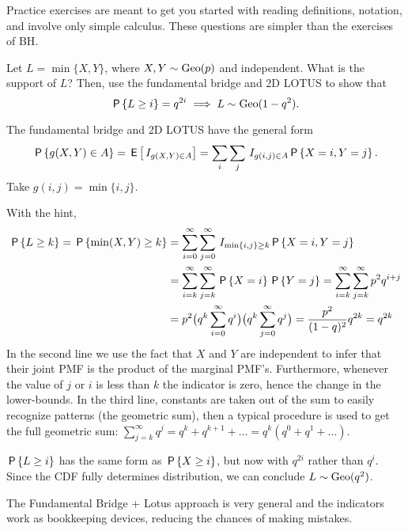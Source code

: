 Practice exercises are meant to get you started with reading definitions, notation, and involve only simple calculus.
These questions are simpler than the exercises of BH.

\begin{exercise}
Let $L=\min\{X, Y\}$, where $X, Y\sim \Geo{p}$ and independent.
What is the support of $L$? Then, use the fundamental bridge and 2D LOTUS to show that
\begin{equation*}
\P{L\geq i}=q^{2i} \implies L\sim\Geo{1-q^{2}}.
\end{equation*}
\begin{hint}
The fundamental bridge and 2D LOTUS have  the general form
\begin{equation*}
\P{g(X,Y)\in A} = \E{\1{g(X, Y) \in A}} = \sum_{i}\sum_j \1{g(i, j)\in A} \P{X=i, Y=j}.
  \end{equation*}
Take  $g(i,j) = \min\{i, j\}$.
\end{hint}
\begin{solution}
With the hint,
  \begin{align*}
\P{L\geq k} = \P{\min(X, Y) \geq k} 
&= \sum_{i=0}^\infty \sum_{j=0}^\infty \1{\min\{i,j\}\geq k} \P{X=i, Y=j}\\
&= \sum_{i=k}^\infty \sum_{j=k}^\infty \P{X=i}\P{Y=j} = \sum_{i=k}^\infty \sum_{j=k}^\infty p^2q^{i + j} \\
&= p^2 \big ( q^k \sum_{i=0}^\infty q^i \big) \big( q^k \sum_{j=0}^\infty q^j \big) = \frac{p^2}{(1 - q)^2} q^{2k} = q^{2k}
  \end{align*}
In the second line we use the fact that $X$ and $Y$ are independent to infer that their joint PMF is the product of the marginal PMF's.
Furthermore, whenever the value of $j$ or $i$ is less than $k$ the indicator is zero, hence the change in the lower-bounds.
In the third line, constants are taken out of the sum to easily recognize patterns (the geometric sum),
then a typical procedure is used to get the full geometric sum: $\sum_{j=k}^\infty q^j = q^k + q^{k+1} + \dots = q^k (q^0 + q^1 + \dots)$.

$\P{L\geq i}$ has the same form as $\P{X\geq i}$, but now with
$q^{2i}$ rather than $q^{i}$. Since the CDF fully determines
distribution, we can conclude $L\sim \Geo{q^2}$.

The Fundamental Bridge + Lotus approach is very general and the
indicators work as bookkeeping devices, reducing the chances of making
mistakes.


\end{solution}
\end{exercise}
